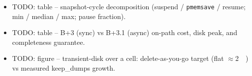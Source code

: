 \documentclass[conference]{IEEEtran}
\begin{document}
\begin{itemize}
\begin{itemize}
            (correlated residuals), which is fatal for the per-cell measurements
            this engine exists to produce;
      \item it does not match the single-VM production/deployment model.
    \end{itemize}
  \item TODO: table -- snapshot-cycle decomposition (suspend / \texttt{pmemsave}
        / resume; min / median / max; pause fraction).
  \item TODO: table -- B+3 (sync) vs B+3.1 (async) on-path cost, disk peak, and
        completeness guarantee.
  \item TODO: figure -- transient-disk over a cell: delete-as-you-go target
        (flat $\approx$\SI{2}{\gibi\byte}) vs measured keep\_dumps growth.
\end{itemize}

\end{document}
